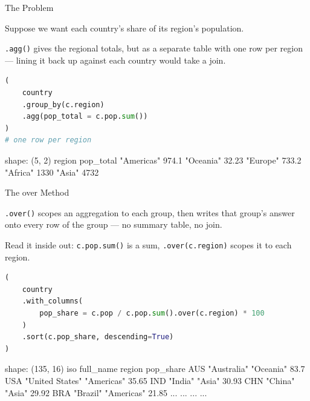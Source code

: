 \documentclass[8pt,aspectratio=169]{beamer}
\begin{document}
\begin{frame}[fragile]{The Problem}
\begin{splitcode}{%

Suppose we want each country's share of its region's population.

\texttt{.agg()} gives the regional totals, but as a separate table with one row per region --- lining it back up against each country would take a join.

}
\begin{lstlisting}[language=Python]
(
    country
    .group_by(c.region)
    .agg(pop_total = c.pop.sum())
)
# one row per region
\end{lstlisting}
\begin{codeoutput}
shape: (5, 2)
region      pop_total
"Americas"  974.1
"Oceania"   32.23
"Europe"    733.2
"Africa"    1330
"Asia"      4732
\end{codeoutput}
\end{splitcode}
\end{frame}

\begin{frame}[fragile]{The over Method}
\begin{splitcode}{%

\texttt{.over()} scopes an aggregation to each group, then writes that group's answer onto every row of the group --- no summary table, no join.

Read it inside out: \texttt{c.pop.sum()} is a sum, \texttt{.over(c.region)} scopes it to each region.

}
\begin{lstlisting}[language=Python]
(
    country
    .with_columns(
        pop_share = c.pop / c.pop.sum().over(c.region) * 100
    )
    .sort(c.pop_share, descending=True)
)
\end{lstlisting}
\begin{codeoutput}
shape: (135, 16)
iso  full_name         region     pop_share
AUS  "Australia"       "Oceania"  83.7
USA  "United States"   "Americas" 35.65
IND  "India"           "Asia"     30.93
CHN  "China"           "Asia"     29.92
BRA  "Brazil"          "Americas" 21.85
...  ...               ...        ...
\end{codeoutput}
\end{splitcode}
\end{frame}
\end{document}
